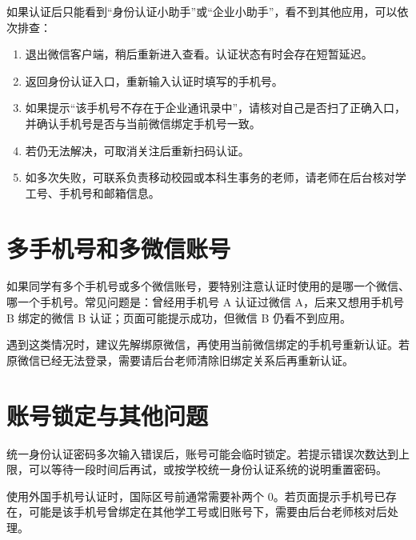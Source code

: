 如果认证后只能看到“身份认证小助手”或“企业小助手”，看不到其他应用，可以依次排查：

\begin{enumerate}
  \item 退出微信客户端，稍后重新进入查看。认证状态有时会存在短暂延迟。
  \item 返回身份认证入口，重新输入认证时填写的手机号。
  \item 如果提示“该手机号不存在于企业通讯录中”，请核对自己是否扫了正确入口，并确认手机号是否与当前微信绑定手机号一致。
  \item 若仍无法解决，可取消关注后重新扫码认证。
  \item 如多次失败，可联系负责移动校园或本科生事务的老师，请老师在后台核对学工号、手机号和邮箱信息。
\end{enumerate}

\section{多手机号和多微信账号}

如果同学有多个手机号或多个微信账号，要特别注意认证时使用的是哪一个微信、哪一个手机号。常见问题是：曾经用手机号 A 认证过微信 A，后来又想用手机号 B 绑定的微信 B 认证；页面可能提示成功，但微信 B 仍看不到应用。

遇到这类情况时，建议先解绑原微信，再使用当前微信绑定的手机号重新认证。若原微信已经无法登录，需要请后台老师清除旧绑定关系后再重新认证。

\section{账号锁定与其他问题}

统一身份认证密码多次输入错误后，账号可能会临时锁定。若提示错误次数达到上限，可以等待一段时间后再试，或按学校统一身份认证系统的说明重置密码。

使用外国手机号认证时，国际区号前通常需要补两个 0。若页面提示手机号已存在，可能是该手机号曾绑定在其他学工号或旧账号下，需要由后台老师核对后处理。
